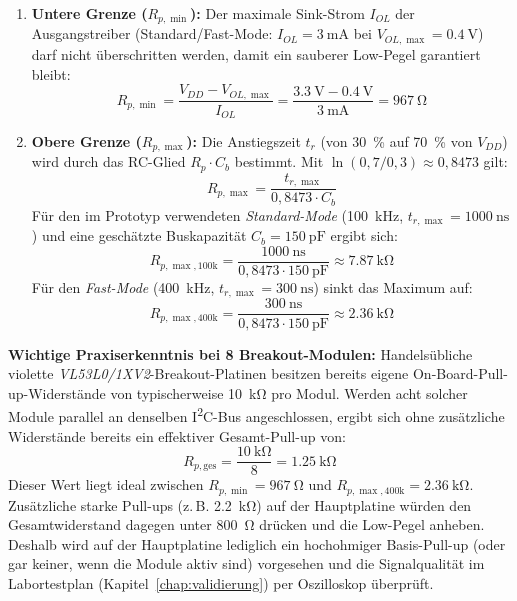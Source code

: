 \begin{enumerate}
  \item \textbf{Untere Grenze ($R_{p,\min}$):} Der maximale Sink-Strom $I_{OL}$ der Ausgangstreiber (Standard/Fast-Mode: $I_{OL} = \qty{3}{\milli\ampere}$ bei $V_{OL,\max} = \qty{0,4}{\volt}$) darf nicht überschritten werden, damit ein sauberer Low-Pegel garantiert bleibt:
  \begin{equation}
    R_{p,\min} = \frac{V_{DD} - V_{OL,\max}}{I_{OL}} = \frac{\qty{3,3}{\volt} - \qty{0,4}{\volt}}{\qty{3}{\milli\ampere}} = \qty{967}{\ohm}
    \label{eq:i2c_rpmin}
  \end{equation}
  \item \textbf{Obere Grenze ($R_{p,\max}$):} Die Anstiegszeit $t_r$ (von \qty{30}{\percent} auf \qty{70}{\percent} von $V_{DD}$) wird durch das RC-Glied $R_p \cdot C_b$ bestimmt. Mit $\ln(0{,}7/0{,}3) \approx 0{,}8473$ gilt:
  \begin{equation}
    R_{p,\max} = \frac{t_{r,\max}}{0{,}8473 \cdot C_b}
    \label{eq:i2c_rpmax}
  \end{equation}
  Für den im Prototyp verwendeten \emph{Standard-Mode} (\qty{100}{\kilo\hertz}, $t_{r,\max} = \qty{1000}{\nano\second}$) und eine geschätzte Buskapazität $C_b = \qty{150}{\pico\farad}$ ergibt sich:
  \begin{equation}
    R_{p,\max,\mathrm{100k}} = \frac{\qty{1000}{\nano\second}}{0{,}8473 \cdot \qty{150}{\pico\farad}} \approx \qty{7,87}{\kilo\ohm}
    \label{eq:i2c_rpmax_100}
  \end{equation}
  Für den \emph{Fast-Mode} (\qty{400}{\kilo\hertz}, $t_{r,\max} = \qty{300}{\nano\second}$) sinkt das Maximum auf:
  \begin{equation}
    R_{p,\max,\mathrm{400k}} = \frac{\qty{300}{\nano\second}}{0{,}8473 \cdot \qty{150}{\pico\farad}} \approx \qty{2,36}{\kilo\ohm}
    \label{eq:i2c_rpmax_400}
  \end{equation}
\end{enumerate}

\textbf{Wichtige Praxiserkenntnis bei 8 Breakout-Modulen:} Handelsübliche violette \emph{VL53L0/1XV2}-Breakout-Platinen besitzen bereits eigene On-Board-Pull-up-Widerstände von typischerweise \qty{10}{\kilo\ohm} pro Modul. Werden acht solcher Module parallel an denselben I\textsuperscript{2}C-Bus angeschlossen, ergibt sich ohne zusätzliche Widerstände bereits ein effektiver Gesamt-Pull-up von:
\begin{equation}
  R_{p,\mathrm{ges}} = \frac{\qty{10}{\kilo\ohm}}{8} = \qty{1,25}{\kilo\ohm}
  \label{eq:i2c_rp_parallel}
\end{equation}
Dieser Wert liegt ideal zwischen $R_{p,\min} = \qty{967}{\ohm}$ und $R_{p,\max,\mathrm{400k}} = \qty{2,36}{\kilo\ohm}$. Zusätzliche starke Pull-ups (z.\,B. \qty{2,2}{\kilo\ohm}) auf der Hauptplatine würden den Gesamtwiderstand dagegen unter \qty{800}{\ohm} drücken und die Low-Pegel anheben. Deshalb wird auf der Hauptplatine lediglich ein hochohmiger Basis-Pull-up (oder gar keiner, wenn die Module aktiv sind) vorgesehen und die Signalqualität im Labortestplan (Kapitel~\ref{chap:validierung}) per Oszilloskop überprüft.

